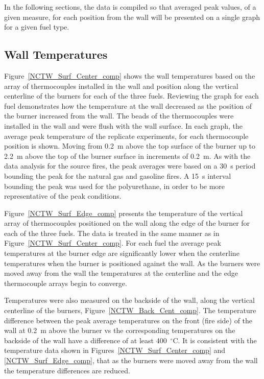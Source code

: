\documentclass[twoside]{uocthesis}
\begin{document}
{In the following sections, the data is compiled so that averaged peak values, of a given measure, for each position from the wall will be presented on a single graph for a given fuel type.

\subsection{Wall Temperatures}

Figure~\ref{NCTW_Surf_Center_comp} shows the wall temperatures based on the array of thermocouples installed in the wall and position along the vertical centerline of the burners for each of the three fuels. Reviewing the graph for each fuel demonstrates how the temperature at the wall decreased as the position of the burner increased from the wall. The beads of the thermocouples were installed in the wall and were flush with the wall surface. In each graph, the average peak temperature of the replicate experiments, for each thermocouple position is shown. Moving from 0.2~m above the top surface of the burner up to 2.2~m above the top of the burner surface in increments of 0.2~m. As with the data analysis for the source fires, the peak averages were based on a 30~s period bounding the peak for the natural gas and gasoline fires.  A 15~s interval bounding the peak was used for the polyurethane, in order to be more representative of the peak conditions.

Figure~\ref{NCTW_Surf_Edge_comp} presents the temperature of the vertical array of thermocouples positioned on the wall along the edge of the burner for each of the three fuels.  The data is treated in the same manner as in Figure~\ref{NCTW_Surf_Center_comp}.  For each fuel the average peak temperatures at the burner edge are significantly lower when the centerline temperatures when the burner is positioned against the wall.  As the burners were moved away from the wall the temperatures at the centerline and the edge thermocouple arrays begin to converge.

Temperatures were also measured on the backside of the wall, along the vertical centerline of the burners, Figure~\ref{NCTW_Back_Cent_comp}. The temperature difference between the peak average temperatures on the front (fire side) of the wall at 0.2~m above the burner vs the corresponding temperatures on the backside of the wall have a difference of at least 400~$^\circ$C.  It is consistent with the temperature data shown in Figures~\ref{NCTW_Surf_Center_comp} and \ref{NCTW_Surf_Edge_comp}, that as the burners were moved away from the wall the temperature differences are reduced.

}
\end{document}
